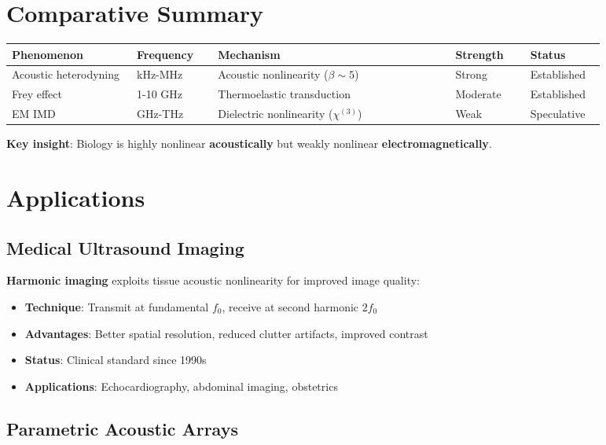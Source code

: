 \section{Comparative Summary}

{\footnotesize
\begin{longtable}{@{}p{0.20\linewidth}p{0.13\linewidth}p{0.38\linewidth}p{0.12\linewidth}p{0.12\linewidth}@{}}
\toprule
\textbf{Phenomenon} & \textbf{Frequency} & \textbf{Mechanism} & \textbf{Strength} & \textbf{Status} \\
\midrule
\endhead
\bottomrule
\endlastfoot
Acoustic heterodyning & kHz-MHz & Acoustic nonlinearity ($\beta \sim 5$) & Strong & Established \\
Frey effect & 1-10 GHz & Thermoelastic transduction & Moderate & Established \\
EM IMD & GHz-THz & Dielectric nonlinearity ($\chi^{(3)}$) & Weak & Speculative \\
\end{longtable}
}

\textbf{Key insight}: Biology is highly nonlinear \textbf{acoustically} but weakly nonlinear \textbf{electromagnetically}.

\section{Applications}

\subsection{Medical Ultrasound Imaging}

\textbf{Harmonic imaging} exploits tissue acoustic nonlinearity for improved image quality:
\begin{itemize}
\item \textbf{Technique}: Transmit at fundamental $f_0$, receive at second harmonic $2f_0$
\item \textbf{Advantages}: Better spatial resolution, reduced clutter artifacts, improved contrast
\item \textbf{Status}: Clinical standard since 1990s
\item \textbf{Applications}: Echocardiography, abdominal imaging, obstetrics
\end{itemize}

\subsection{Parametric Acoustic Arrays}

